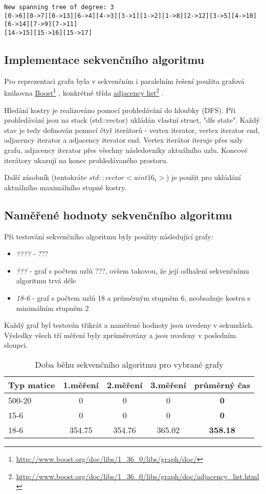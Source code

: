 \documentclass[]{article}
\newcommand\fnurl[2]{%
  \href{#2}{#1}\footnote{\url{#2}}%
}
\begin{document}
\begin{verbatim}
New spanning tree of degree: 3
[0->6][0->7][0->13][6->4][4->3][3->1][1->2][1->8][2->12][3->5][4->10][6->14][7->9][7->11]
[14->15][15->16][15->17]
\end{verbatim}

\subsection{Implementace sekvenčního algoritmu}
Pro reprezentaci grafu byla v sekvenčním i paralelním řešení použita grafová knihovna \fnurl{Boost}{http://www.boost.org/doc/libs/1_36_0/libs/graph/doc/}, konkrétně třída \fnurl{adjacency list}{http://www.boost.org/doc/libs/1_36_0/libs/graph/doc/adjacency_list.html}.

Hledání kostry je realizováno pomocí prohledávání do hloubky (DFS). Při prohledávání jsou na stack (std::vector) ukládán vlastní struct, "dfs state". Každý stav je tedy definován pomocí čtyř iterátorů - vertex iterator, vertex iterator end, adjacency iterator a adjacency iterator end. Vertex iterátor iteruje přes uzly grafu, adjacency iterator přes všechny následovníky aktuálního uzlu. Koncové iterátory ukazují na konec prohledávaného prostoru.

Další zásobník (tentokráte $std::vector<uint16_t>$) je použit pro ukládání aktuálního maximálního stupně kostry. 

\subsection{Naměřené hodnoty sekvenčního algoritmu}
Při testování sekvenčního algoritmu byly použity následující grafy:

\begin{itemize}
  \item \textit{????} - ???
  \item \textit{???} - graf s počtem uzlů ???, ovšem takovou, že její odhalení sekvenčnímu algoritmu trvá déle
  \item \textit{18-6} - graf s počtem uzlů 18 a průměrným stupněm 6, neobsahuje kostru s minimálním stupněm 2
\end{itemize}

Každý graf byl testován třikrát a naměřené hodnoty jsou uvedeny v sekundách. Výsledky všech tří měření byly zprůměrovány a jsou uvedeny v posledním sloupci.

\begin{table}[ht]
\centering
\begin{tabular}{|l|c|c|c|c|}
\hline \textbf{Typ matice} & \textbf{1.měření} & \textbf{2.měření} & \textbf{3.měření} & \textbf{průměrný čas} \\
\hline 
\hline 500-20 & 0 & 0 & 0 & \textbf{0} \\ 
\hline 15-6 & 0 & 0 & 0 & \textbf{0} \\ 
\hline 18-6 & 354.75 & 354.76 & 365.02 & \textbf{358.18} \\ 
\hline 
\end{tabular}
\caption{Doba běhu sekvenčního algoritmu pro vybrané grafy}
\label{sekvencni_test}	
\end{table}
\end{document}
